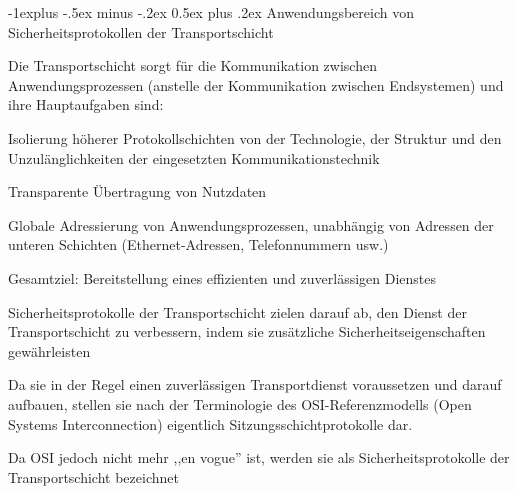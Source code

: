 \documentclass[a4paper]{article}
\makeatletter
\renewcommand{\subsection}{\@startsection{subsection}{2}{0mm}%
 {-1explus -.5ex minus -.2ex}%
 {0.5ex plus .2ex}%
 {\normalfont\normalsize\bfseries}}
\makeatother
\begin{document}
\begin{multicols}{3}
\begin{itemize*}
            \subsection{Anwendungsbereich von Sicherheitsprotokollen der
                  Transportschicht}
            \begin{itemize*}
                  \item       Die Transportschicht sorgt für die Kommunikation zwischen
                  Anwendungsprozessen (anstelle der Kommunikation zwischen Endsystemen)
                  und ihre Hauptaufgaben sind:
                  \begin{itemize*}
                        \item Isolierung höherer Protokollschichten von der Technologie, der Struktur und den Unzulänglichkeiten der eingesetzten Kommunikationstechnik
                        \item Transparente Übertragung von Nutzdaten
                        \item Globale Adressierung von Anwendungsprozessen, unabhängig von Adressen der unteren Schichten (Ethernet-Adressen, Telefonnummern usw.)
                        \item Gesamtziel: Bereitstellung eines effizienten und zuverlässigen Dienstes
                  \end{itemize*}
                  \item       Sicherheitsprotokolle der Transportschicht zielen darauf ab, den
                  Dienst der Transportschicht zu verbessern, indem sie zusätzliche
                  Sicherheitseigenschaften gewährleisten
                  \begin{itemize*}
                        \item Da sie in der Regel einen zuverlässigen Transportdienst voraussetzen und darauf aufbauen, stellen sie nach der Terminologie des OSI-Referenzmodells (Open Systems Interconnection) eigentlich Sitzungsschichtprotokolle dar.
                        \item Da OSI jedoch nicht mehr ,,en vogue'' ist, werden sie als Sicherheitsprotokolle der Transportschicht bezeichnet
                  \end{itemize*}
            \end{itemize*}


\end{itemize*}
\end{multicols}
\end{document}
